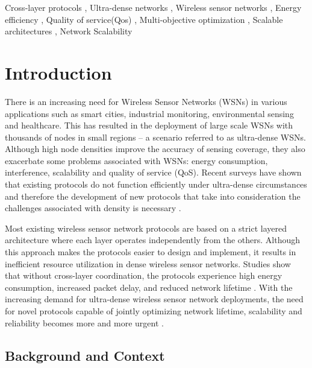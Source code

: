 \documentclass[a4paper,fleqn]{cas-dc}
\numberwithin{equation}{section}
\begin{document}
\begin{keywords}
Cross-layer protocols \sep 
Ultra-dense networks \sep 
Wireless sensor networks \sep 
Energy efficiency \sep
Quality of service(Qos) \sep 
 Multi-objective optimization \sep
Scalable architectures \sep
Network Scalability
\end{keywords}

\maketitle

\section{Introduction}

There is an increasing need for Wireless Sensor Networks (WSNs) in various applications such as smart cities, industrial monitoring, environmental sensing and healthcare. This has resulted in the deployment of large scale WSNs with thousands of nodes in small regions – a scenario referred to as ultra-dense WSNs. Although high node densities improve the accuracy of sensing coverage, they also exacerbate some problems associated with WSNs: energy consumption, interference, scalability and quality of service (QoS). Recent surveys have shown that existing protocols do not function efficiently under ultra-dense circumstances and therefore the development of new protocols that take into consideration the challenges associated with density is necessary \cite{Thakur2025}.

Most existing wireless sensor network protocols are based on a strict layered architecture where each layer operates independently from the others. Although this approach makes the protocols easier to design and implement, it results in inefficient resource utilization in dense wireless sensor networks. Studies show that without cross-layer coordination, the protocols experience high energy consumption, increased packet delay, and reduced network lifetime \cite{Amirova2025}. With the increasing demand for ultra-dense wireless sensor network deployments, the need for novel protocols capable of jointly optimizing network lifetime, scalability and reliability becomes more and more urgent \cite{Petrescu2025}.

\subsection{Background and Context}
\end{document}
